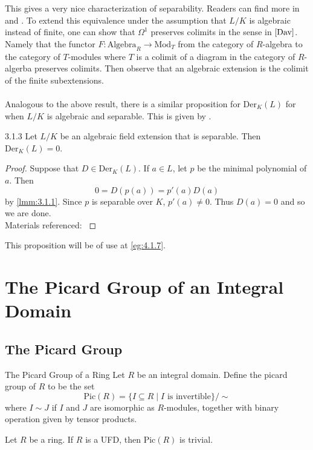 \documentclass[a4paper]{article}
\begin{document}
This gives a very nice characterization of separability. Readers can find more in \cite{Har} and \cite{Liu}. To extend this equivalence under the assumption that $L/K$ is algebraic instead of finite, one can show that $\Omega^1$ preserves colimits in the sense in $\cite{Dav}$. Namely that the functor $F:\text{Algebra}_R\to\text{Mod}_T$ from the category of $R$-algebra to the category of $T$-modules where $T$ is a colimit of a diagram in the category of $R$-algerba preserves colimits. Then observe that an algebraic extension is the colimit of the finite subextensions. \\~\\

Analogous to the above result, there is a similar proposition for $\text{Der}_K(L)$ for when $L/K$ is algebraic and separable. This is given by \cite{Pat}. 

\begin{prp}{}{3.1.3} Let $L/K$ be an algebraic field extension that is separable. Then $\text{Der}_K(L)=0$. 
\begin{proof}
Suppose that $D\in\text{Der}_K(L)$. If $a\in L$, let $p$ be the minimal polynomial of $a$. Then $$0=D(p(a))=p'(a)D(a)$$ by \ref{lmm:3.1.1}. Since $p$ is separable over $K$, $p'(a)\neq 0$. Thus $D(a)=0$ and so we are done. \\
Materials referenced: \cite{Pat}
\end{proof}
\end{prp}

This proposition will be of use at \ref{eg:4.1.7}. 

\pagebreak
\section{The Picard Group of an Integral Domain}
\subsection{The Picard Group}
\begin{defn}{The Picard Group of a Ring}{} Let $R$ be an integral domain. Define the picard group of $R$ to be the set $$\text{Pic}(R)=\{I\subseteq R\;|\;I\text{ is invertible}\}/\sim$$ where $I\sim J$ if $I$ and $J$ are isomorphic as $R$-modules, together with binary operation given by tensor products. 
\end{defn}

\begin{lmm}{}{} Let $R$ be a ring. If $R$ is a UFD, then $\text{Pic}(R)$ is trivial. 
\end{lmm}
\end{document}
